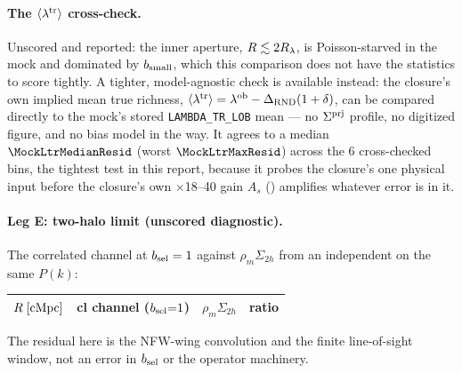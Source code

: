 \paragraph{The $\langle\lambda^{\rm tr}\rangle$ cross-check.} Unscored and reported:
the inner aperture, $R\lesssim2R_\lambda$, is Poisson-starved in the mock and
dominated by $b_{\rm small}$, which this comparison does not have the
statistics to score tightly. A tighter, model-agnostic check is available
instead: the closure's own implied mean true richness,
$\langle\lambda^{\rm tr}\rangle=\lambda^{\rm ob}-\Delta_{\rm RND}(1+\delta)$, can be compared directly to
the mock's stored \texttt{LAMBDA\_TR\_LOB} mean --- no $\Sigma^{\rm prj}$ profile, no
digitized figure, and no bias model in the way. It agrees to a median
$\MockLtrMedianResid$ (worst $\MockLtrMaxResid$) across the 6
cross-checked bins, the tightest test in this report, because it probes
the closure's one physical input before the closure's own $\times$18--40
gain $A_s$ () amplifies whatever
error is in it.

\paragraph{Leg E: two-halo limit (unscored diagnostic).} The correlated
channel at $b_{\rm sel}=1$ against $\rho_m\Sigma_{2h}$ from an independent
 on the same $P(k)$:

\begin{center}
\begin{tabular}{rrrr}
\toprule
$R\;[{\rm cMpc}]$ & cl channel ($b_{\rm sel}{=}1$) & $\rho_m\Sigma_{2h}$ & ratio \\
\midrule

\bottomrule
\end{tabular}
\end{center}

The residual here is the NFW-wing convolution and the finite line-of-sight
window, not an error in $b_{\rm sel}$ or the operator machinery.
